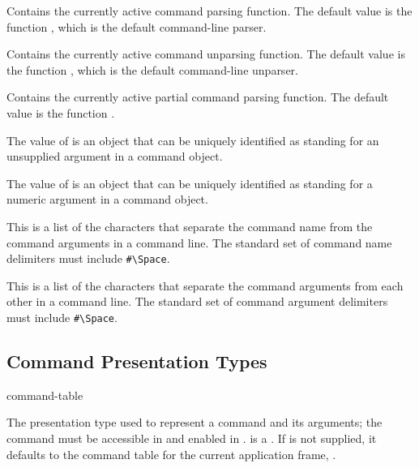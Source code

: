 Contains the currently active command parsing function.  The default value is
the function , which is the default command-line
parser.


Contains the currently active command unparsing function.  The default value is
the function , which is the default
command-line unparser.


Contains the currently active partial command parsing function.  The default value
is the function .


The value of  is an object that can be uniquely
identified as standing for an unsupplied argument in a command object.


The value of  is an object that can be uniquely
identified as standing for a numeric argument in a command object.


This is a list of the characters that separate the command name from the command
arguments in a command line.  The standard set of command name delimiters must
include \verb+#\Space+.


This is a list of the characters that separate the command arguments from each
other in a command line.  The standard set of command argument delimiters must
include \verb+#\Space+.


\subsection {Command Presentation Types}

 {\key command-table}

The presentation type used to represent a command and its arguments; the command
must be accessible in  and enabled in
.   is a .  If  is not supplied, it defaults to the command
table for the current application frame, .

